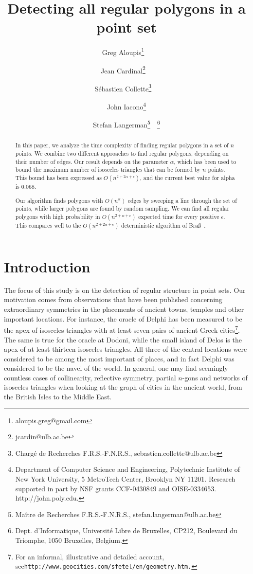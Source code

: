 \documentclass{article}
\title{Detecting all regular polygons in a point set}
\author{Greg Aloupis\thanks{aloupis.greg@gmail.com}~~\footnotemark[6]
\and Jean Cardinal\thanks{jcardin@ulb.ac.be}~~\footnotemark[6]
\and S\'ebastien Collette\thanks{Charg\'{e} de Recherches F.R.S.-F.N.R.S.,
sebastien.collette@ulb.ac.be}~~\footnotemark[6]
\and John Iacono\thanks{Department of Computer  Science and Engineering,
Polytechnic Institute of New York University, 5 MetroTech Center, Brooklyn NY 11201. Research
supported in part by
NSF grants CCF-0430849 and OISE-0334653. http://john.poly.edu.}
\and Stefan Langerman\thanks{Ma\^{i}tre de Recherches F.R.S.-F.N.R.S.,
stefan.langerman@ulb.ac.be}~~\footnote{Dept. d'Informatique, Universit\'e Libre de Bruxelles, CP212,
Boulevard du Triomphe, 1050 Bruxelles, Belgium.}
}
\begin{document}
\maketitle

\begin{abstract}
In this paper, we analyze the time complexity of finding regular polygons
in a set of $n$ points. We combine two different approaches to find
regular polygons, depending on their number of edges.  
Our result depends on the parameter $\alpha$, which has been used to bound
the maximum number of isosceles triangles that can be formed by $n$ points. 
This bound has been expressed as $O(n^{2{+}2\alpha{+}\epsilon})$, and the current best value
for alpha is $0.068$.

Our algorithm finds polygons with 
$O(n^{\alpha})$ edges  by sweeping a line through the set of
points, while  larger polygons are found by random sampling. We can
find all regular polygons with high probability in $O(n^{2{+}\alpha{+}\epsilon})$ expected time for
every positive $\epsilon$.  This compares well to the
$O(n^{2{+}2\alpha+\epsilon})$ deterministic algorithm of Bra{\ss}~\cite{brass}.
\end{abstract}




\section{Introduction}


The focus of this study is on the detection of regular structure in point sets.
Our motivation comes from observations that have been published concerning
extraordinary symmetries in the placements of ancient towns, temples and other
important locations. 
For instance, the oracle of Delphi has been measured to
be the apex of isosceles triangles with at least seven pairs of ancient Greek
cities\footnote{For an informal, illustrative and detailed account, see\newline \tt{http://www.geocities.com/sfetel/en/geometry.htm}.}.  The same is true for the oracle at Dodoni, while the small island
of Delos is the apex of at least thirteen isosceles triangles.  All three of the
central locations were considered to be among the most important of places, and
in fact Delphi was considered to be the navel of the world.  In general, one may
find seemingly countless cases of collinearity, reflective symmetry,
partial $n$-gons and networks of 
isosceles triangles when looking at the graph of cities in the ancient world, 
from the British Isles to the Middle East.  
\end{document}
